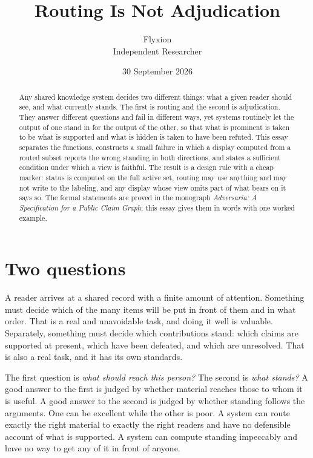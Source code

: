 \documentclass[11pt]{article}
\title{Routing Is Not Adjudication}
\author{Flyxion\\\small Independent Researcher}
\date{30 September 2026}
\begin{document}
\maketitle

\begin{abstract}
\noindent
Any shared knowledge system decides two different things: what a given reader should see, and what currently stands. The first is routing and the second is adjudication. They answer different questions and fail in different ways, yet systems routinely let the output of one stand in for the output of the other, so that what is prominent is taken to be what is supported and what is hidden is taken to have been refuted. This essay separates the functions, constructs a small failure in which a display computed from a routed subset reports the wrong standing in both directions, and states a sufficient condition under which a view is faithful. The result is a design rule with a cheap marker: status is computed on the full active set, routing may use anything and may not write to the labeling, and any display whose view omits part of what bears on it says so. The formal statements are proved in the monograph \emph{Adversaria: A Specification for a Public Claim Graph}; this essay gives them in words with one worked example.
\end{abstract}

\section{Two questions}

A reader arrives at a shared record with a finite amount of attention. Something must decide which of the many items will be put in front of them and in what order. That is a real and unavoidable task, and doing it well is valuable. Separately, something must decide which contributions stand: which claims are supported at present, which have been defeated, and which are unresolved. That is also a real task, and it has its own standards.

The first question is \emph{what should reach this person?} The second is \emph{what stands?} A good answer to the first is judged by whether material reaches those to whom it is useful. A good answer to the second is judged by whether standing follows the arguments. One can be excellent while the other is poor. A system can route exactly the right material to exactly the right readers and have no defensible account of what is supported. A system can compute standing impeccably and have no way to get any of it in front of anyone.
\end{document}
